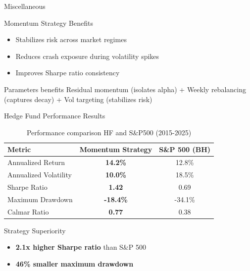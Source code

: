 \documentclass[12pt, aspectratio=43]{beamer}
\begin{document}
	\begin{frame}{Miscellaneous}
			\footnotesize
			\begin{block}{Momentum Strategy Benefits}
				\begin{itemize}
					\item Stabilizes risk across market regimes
					\item Reduces crash exposure during volatility spikes
					\item Improves Sharpe ratio consistency
				\end{itemize}
			\end{block}
		
		\begin{block}{Parameters benefits}
			Residual momentum (isolates alpha) + Weekly rebalancing (captures decay) + Vol targeting (stabilizes risk)
		\end{block}
	\end{frame}
	

	
	\begin{frame}{Hedge Fund Performance Results}
		\centering
		\small
		\begin{table}
			\begin{tabular}{lcc}
				\toprule
				Metric & Momentum Strategy & S\&P 500 (BH) \\
				\midrule
				Annualized Return & \textbf{14.2\%} & 12.8\% \\
				Annualized Volatility & \textbf{10.0\%} & 18.5\% \\
				Sharpe Ratio & \textbf{1.42} & 0.69 \\
				Maximum Drawdown & \textbf{-18.4\%} & -34.1\% \\
				Calmar Ratio & \textbf{0.77} & 0.38 \\
				\bottomrule
			\end{tabular}
			\caption{Performance comparison HF and S\&P500 (2015-2025)}
		\end{table}
		\vspace{-3mm}
		\begin{block}{Strategy Superiority}
			\begin{itemize}
				\item \textbf{2.1x higher Sharpe ratio} than S\&P 500
				\item \textbf{46\% smaller maximum drawdown}
			\end{itemize}
		\end{block}
		
	\end{frame}
	
\end{document}
